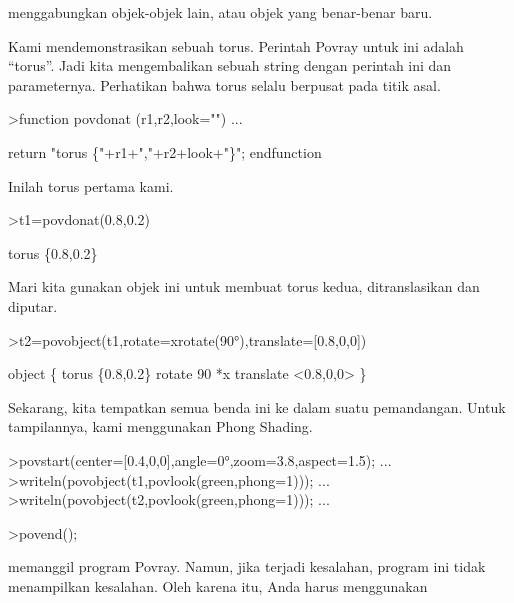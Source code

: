\documentclass[a4paper,10pt]{article}
\begin{document}
\begin{eulernotebook}
\begin{eulercomment}
\begin{eulercomment}
\begin{eulercomment}
\begin{eulercomment}
\begin{eulercomment}
\begin{eulercomment}
\begin{eulercomment}
\begin{eulercomment}
\begin{eulercomment}
\begin{eulercomment}
\begin{eulercomment}
\begin{eulercomment}
\begin{eulercomment}
\begin{eulercomment}
\begin{eulercomment}
\begin{eulercomment}
\begin{eulercomment}
menggabungkan objek-objek lain, atau objek yang benar-benar baru.

Kami mendemonstrasikan sebuah torus. Perintah Povray untuk ini adalah
“torus”. Jadi kita mengembalikan sebuah string dengan perintah ini dan
parameternya. Perhatikan bahwa torus selalu berpusat pada titik asal.
\end{eulercomment}
\begin{eulerprompt}
>function povdonat (r1,r2,look="") ...
\end{eulerprompt}
\begin{eulerudf}
    return "torus \{"+r1+","+r2+look+"\}";
  endfunction
\end{eulerudf}
\begin{eulercomment}
Inilah torus pertama kami.
\end{eulercomment}
\begin{eulerprompt}
>t1=povdonat(0.8,0.2)
\end{eulerprompt}
\begin{euleroutput}
  torus \{0.8,0.2\}
\end{euleroutput}
\begin{eulercomment}
Mari kita gunakan objek ini untuk membuat torus kedua, ditranslasikan
dan diputar.
\end{eulercomment}
\begin{eulerprompt}
>t2=povobject(t1,rotate=xrotate(90°),translate=[0.8,0,0])
\end{eulerprompt}
\begin{euleroutput}
  object \{ torus \{0.8,0.2\}
   rotate 90 *x 
   translate <0.8,0,0>
   \}
\end{euleroutput}
\begin{eulercomment}
Sekarang, kita tempatkan semua benda ini ke dalam suatu pemandangan.
Untuk tampilannya, kami menggunakan Phong Shading.
\end{eulercomment}
\begin{eulerprompt}
>povstart(center=[0.4,0,0],angle=0°,zoom=3.8,aspect=1.5); ...
>writeln(povobject(t1,povlook(green,phong=1))); ...
>writeln(povobject(t2,povlook(green,phong=1))); ...
\end{eulerprompt}
\begin{eulerttcomment}
 >povend();
\end{eulerttcomment}
\begin{eulercomment}
memanggil program Povray. Namun, jika terjadi kesalahan, program ini
tidak menampilkan kesalahan. Oleh karena itu, Anda harus menggunakan


\end{eulercomment}
\end{eulercomment}
\end{eulercomment}
\end{eulercomment}
\end{eulercomment}
\end{eulercomment}
\end{eulercomment}
\end{eulercomment}
\end{eulercomment}
\end{eulercomment}
\end{eulercomment}
\end{eulercomment}
\end{eulercomment}
\end{eulercomment}
\end{eulercomment}
\end{eulercomment}
\end{eulercomment}
\end{eulernotebook}
\end{document}
